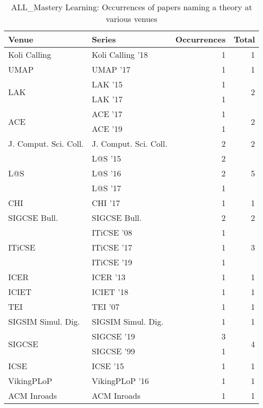 \begin{table*}[t]
\begin{tabular}{llrr}
Venue & Series & Occurrences & Total\\\hline
\multirow{1}{*}{Koli Calling } & Koli Calling '18 & 1 & \multirow{1}{*}{1}\\
\multirow{1}{*}{UMAP } & UMAP '17 & 1 & \multirow{1}{*}{1}\\
\multirow{2}{*}{LAK } & LAK '15 & 1 & \multirow{2}{*}{2}\\
& LAK '17 & 1 &\\
\multirow{2}{*}{ACE } & ACE '17 & 1 & \multirow{2}{*}{2}\\
& ACE '19 & 1 &\\
\multirow{1}{*}{J. Comput. Sci. Coll.} & J. Comput. Sci. Coll. & 2 & \multirow{1}{*}{2}\\
\multirow{3}{*}{L@S } & L@S '15 & 2 & \multirow{3}{*}{5}\\
& L@S '16 & 2 &\\
& L@S '17 & 1 &\\
\multirow{1}{*}{CHI } & CHI '17 & 1 & \multirow{1}{*}{1}\\
\multirow{1}{*}{SIGCSE Bull.} & SIGCSE Bull. & 2 & \multirow{1}{*}{2}\\
\multirow{3}{*}{ITiCSE } & ITiCSE '08 & 1 & \multirow{3}{*}{3}\\
& ITiCSE '17 & 1 &\\
& ITiCSE '19 & 1 &\\
\multirow{1}{*}{ICER } & ICER '13 & 1 & \multirow{1}{*}{1}\\
\multirow{1}{*}{ICIET } & ICIET '18 & 1 & \multirow{1}{*}{1}\\
\multirow{1}{*}{TEI } & TEI '07 & 1 & \multirow{1}{*}{1}\\
\multirow{1}{*}{SIGSIM Simul. Dig.} & SIGSIM Simul. Dig. & 1 & \multirow{1}{*}{1}\\
\multirow{2}{*}{SIGCSE } & SIGCSE '19 & 3 & \multirow{2}{*}{4}\\
& SIGCSE '99 & 1 &\\
\multirow{1}{*}{ICSE } & ICSE '15 & 1 & \multirow{1}{*}{1}\\
\multirow{1}{*}{VikingPLoP } & VikingPLoP '16 & 1 & \multirow{1}{*}{1}\\
\multirow{1}{*}{ACM Inroads} & ACM Inroads & 1 & \multirow{1}{*}{1}\\
\end{tabular}
\caption{ALL\_Mastery Learning: Occurrences of papers naming a theory at various venues}
\end{table*}
